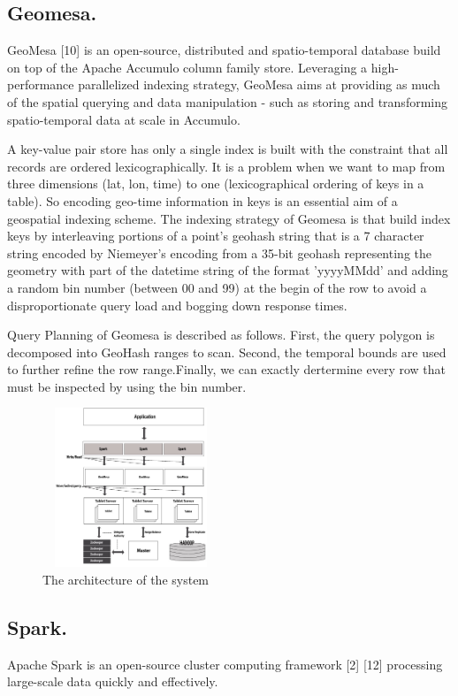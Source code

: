\documentclass{acm_proc_article-sp}
\begin{document}
\subsection{Geomesa. } GeoMesa [10] is an open-source, distributed and spatio-temporal database build on top of the Apache Accumulo column family store. Leveraging a high-performance parallelized indexing strategy, GeoMesa aims at providing as much of the spatial querying and data manipulation - such as storing and transforming spatio-temporal data  at scale in Accumulo.

\setlength{\parindent}{1cm} A key-value pair store has only a single index is built with the constraint that all records are ordered lexicographically. It is a problem when we want to map from three dimensions (lat, lon, time) to one (lexicographical ordering of keys in a table). So encoding geo-time information in keys is an essential aim of a geospatial indexing scheme. The indexing strategy of Geomesa  is that build index keys by interleaving portions of a point's geohash string that is a 7 character string encoded by Niemeyer's encoding from a 35-bit geohash representing the geometry with part of the datetime string of the format 'yyyyMMdd' and adding a random bin number (between 00 and 99) at the begin of the row to avoid a disproportionate query load and bogging down response times.

\setlength{\parindent}{1cm} Query Planning of Geomesa is described as follows. First, the query polygon is decomposed into GeoHash ranges to scan. Second, the temporal bounds are used to further refine the row range.Finally, we can exactly dertermine every row that must be inspected by using the bin number.\\
	\begin{figure}[h]
		\centering
		\includegraphics[height=180px,width=200px]{figure4}
		\caption{The architecture of the system}
		\label{fig:architecture}
	\end{figure}


\subsection{Spark. } Apache Spark is an open-source cluster computing framework [2] [12] processing large-scale data quickly and effectively.
\end{document}
